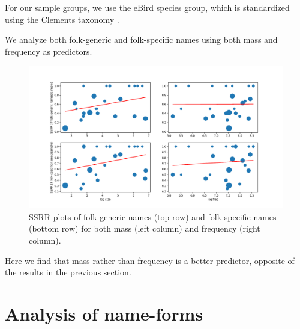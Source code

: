 \documentclass[10pt,letterpaper]{article}
\begin{document}
For our sample groups, we use the eBird species group, which is standardized using the Clements taxonomy \cite{clements2007clements}.

We analyze both folk-generic and folk-specific names using both mass and frequency as predictors.

\begin{figure}[t!]
  \begin{center}
    \includegraphics[width=1.0\textwidth]{./figures/ssrr-bothplots.png}
        \caption{SSRR plots of folk-generic names (top row) and folk-specific names (bottom row) for both mass (left column) and frequency (right column).}
        \label{fig-ssrr}
  \end{center}
\end{figure}


Here we find that mass rather than frequency is a better predictor, opposite of the results in the previous section.

\section{Analysis of name-forms}


\end{document}
